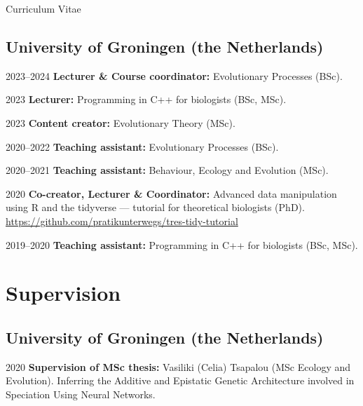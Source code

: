 \documentclass[11pt,a4paper]{article}
\begin{document}
\begin{cv}{Curriculum Vitae}
		\subsection{University of Groningen (the Netherlands)}
		
		\begin{cvlist}{}

            \item[2023--2024]
			\textbf{Lecturer \& Course coordinator:} Evolutionary Processes (BSc).

            \item[2023]
			\textbf{Lecturer:} Programming in C++ for biologists (BSc, MSc).

            \item[2023]
			\textbf{Content creator:} Evolutionary Theory (MSc).

            \item[2020--2022] \textbf{Teaching assistant:} Evolutionary Processes (BSc).
            
			\item[2020--2021] \textbf{Teaching assistant:} Behaviour, Ecology and Evolution (MSc). 

            \item[2020] \textbf{Co-creator, Lecturer \& Coordinator:} Advanced data manipulation using R and the tidyverse --- tutorial for theoretical biologists (PhD).\\
            \url{https://github.com/pratikunterwegs/tres-tidy-tutorial}

            \item[2019--2020] \textbf{Teaching assistant:} Programming in C++ for biologists (BSc, MSc).
			
		\end{cvlist}

        \section{Supervision}

        \subsection{University of Groningen (the Netherlands)}

        \begin{cvlist}{}

            \item[2020] \textbf{Supervision of MSc thesis:} Vasiliki (Celia) Tsapalou (MSc Ecology and Evolution).
			Inferring the Additive and Epistatic Genetic Architecture involved in Speciation Using Neural Networks.
			

\end{cvlist}
\end{cv}
\end{document}
